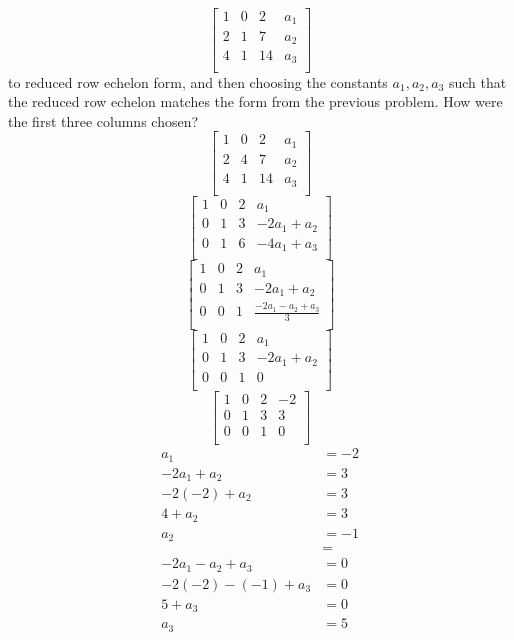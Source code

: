 \begin{prob}
\begin{subprob}
$$\begin{bmatrix}
1 & 0 & 2 & a_1\\
2 & 1 & 7 & a_2\\
4 & 1 & 14 & a_3\\
\end{bmatrix}$$ to reduced row echelon form, and then choosing the constants $a_1,a_2, a_3$ such that the reduced row echelon matches the form from the previous problem. How were the first three columns chosen?\\
$$\begin{bmatrix}
1 & 0 & 2 & a_1\\
2 & 4 & 7 & a_2\\
4 & 1 & 14 & a_3\\
\end{bmatrix}$$
$$\begin{bmatrix}
1 & 0 & 2 & a_1\\
0 & 1 & 3 & -2a_1+a_2\\
0 & 1 & 6 & -4a_1+a_3\\
\end{bmatrix}$$
$$\begin{bmatrix}
1 & 0 & 2 & a_1\\
0 & 1 & 3 & -2a_1+a_2\\
0 & 0 & 1 & \frac{-2a_1-a_2+a_3}{3}\\
\end{bmatrix}$$
$$\begin{bmatrix}
1 & 0 & 2 & a_1\\
0 & 1 & 3 & -2a_1+a_2\\
0 & 0 & 1 & 0\\
\end{bmatrix}$$
$$\begin{bmatrix}
1 & 0 & 2 & -2\\
0 & 1 & 3 & 3\\
0 & 0 & 1 & 0\\
\end{bmatrix}$$
\begin{align*}
a_1&=-2\\
-2a_1+a_2&=3\\
-2(-2)+a_2&=3\\
4+a_2&=3\\
a_2&=-1\\
&=\\
-2a_1-a_2+a_3&=0\\
-2(-2)-(-1)+a_3&=0\\
5+a_3&=0\\
a_3&=5\\
\end{align*}
\end{subprob}
\end{prob}
